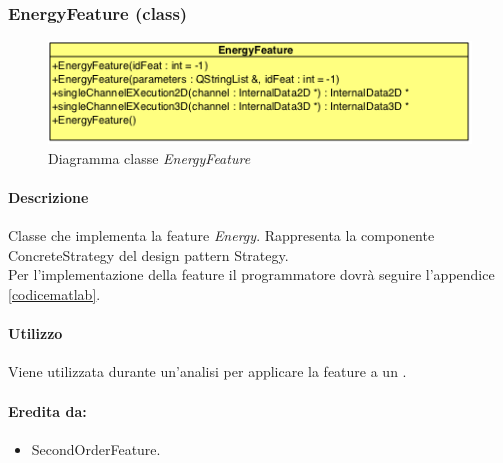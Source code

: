 \begin{itemize}
	\end{itemize}
	
\color{black}
\pagebreak
\subsubsection{EnergyFeature (class)}
\label{EnergyFeature}
\begin{figure}[!h]
\centering
			\includegraphics[scale=1]{./Content/Immagini/modelCore/EnergyFeature.png}
			\caption{Diagramma classe \textsl{EnergyFeature}}
			\label{EnergyFeature_img}
\end{figure}

\paragraph{Descrizione \\} Classe che implementa la feature\g{} \textit{Energy}. Rappresenta la componente ConcreteStrategy del design pattern\g{} Strategy.
\\Per l'implementazione della feature\g{} il programmatore dovrà seguire l'appendice \ref{codicematlab}.

\paragraph{Utilizzo\\} Viene utilizzata durante un'analisi per applicare la feature\g{} a un \dataset{}.

\paragraph{Eredita da:}
\begin{itemize}
	\item SecondOrderFeature.
\end{itemize}


